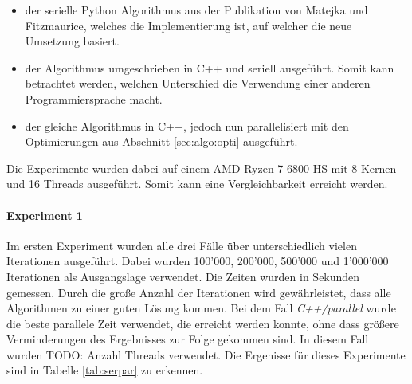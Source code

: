 \documentclass[sigconf]{acmart}
\begin{document}
\begin{itemize}
  \item der serielle Python Algorithmus aus der Publikation von Matejka und Fitzmaurice, welches die Implementierung ist, auf welcher die neue Umsetzung basiert. 
  \item der Algorithmus umgeschrieben in C++ und seriell ausgeführt. Somit kann betrachtet werden, welchen Unterschied die Verwendung einer anderen Programmiersprache macht.
  \item der gleiche Algorithmus in C++, jedoch nun parallelisiert mit den Optimierungen aus Abschnitt \ref{sec:algo:opti} ausgeführt.
\end{itemize}

Die Experimente wurden dabei auf einem AMD Ryzen 7 6800 HS mit 8 Kernen und 16 Threads ausgeführt. Somit kann eine Vergleichbarkeit erreicht werden.

\paragraph{Experiment 1}

Im ersten Experiment wurden alle drei Fälle über unterschiedlich vielen Iterationen ausgeführt. Dabei wurden 100'000, 200'000, 500'000 und 1'000'000 Iterationen als Ausgangslage verwendet. Die Zeiten wurden in Sekunden gemessen. Durch die große Anzahl der Iterationen wird gewährleistet, dass alle Algorithmen zu einer guten Lösung kommen. 
Bei dem Fall \textit{C++/parallel} wurde die beste parallele Zeit verwendet, die erreicht werden konnte, ohne dass größere Verminderungen des Ergebnisses zur Folge gekommen sind. In diesem Fall wurden TODO: Anzahl Threads verwendet.
 Die Ergenisse für dieses Experimente sind in Tabelle \ref{tab:serpar} zu erkennen.
 
\begin{table}[htbp]
  \caption{Vergleich der Algorithmen und Ausführungsart über 100'000, 200'000, 500'000 und 1'000'000 Iterationen. Alle Angaben in Sekunden.}
  \label{tab:serpar}
\end{table}
\end{document}
